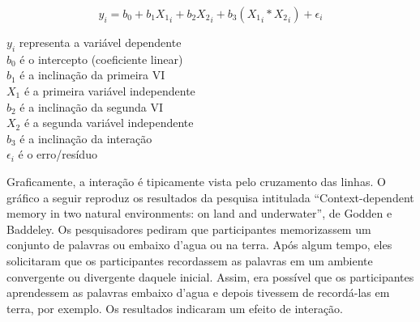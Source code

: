 \documentclass[
]{book}
\begin{document}
\[y_i = b_0 + b_1X{_1}_i + b_2X{_2}_i + b_3(X{_1}_i * X{_2}_i) + \epsilon_{i}\]

\(y_i\) representa a variável dependente\\
\(b_0\) é o intercepto (coeficiente linear)\\
\(b_1\) é a inclinação da primeira VI\\
\(X_1\) é a primeira variável independente\\
\(b_2\) é a inclinação da segunda VI\\
\(X_2\) é a segunda variável independente\\
\(b_3\) é a inclinação da interação\\
\(\epsilon_{i}\) é o erro/resíduo

Graficamente, a interação é tipicamente vista pelo cruzamento das linhas. O gráfico a seguir reproduz os resultados da pesquisa intitulada ``Context-dependent memory in two natural environments: on land and underwater'', de Godden e Baddeley. Os pesquisadores pediram que participantes memorizassem um conjunto de palavras ou embaixo d'agua ou na terra. Após algum tempo, eles solicitaram que os participantes recordassem as palavras em um ambiente convergente ou divergente daquele inicial. Assim, era possível que os participantes aprendessem as palavras embaixo d'agua e depois tivessem de recordá-las em terra, por exemplo. Os resultados indicaram um efeito de interação.
\end{document}
